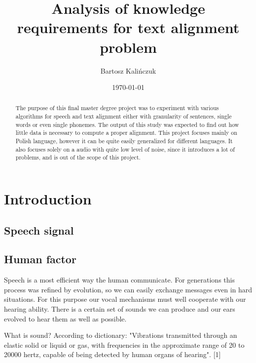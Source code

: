 \documentclass[12pt,a4paper,english]{article}
\begin{document}
\title{Analysis of knowledge requirements for text alignment problem}
\author{Bartosz Kalińczuk}
\date{\today}
\maketitle

\newpage
\begin{abstract}
The purpose of this final master degree project was to experiment with various algorithms for speech and text alignment either with granularity of sentences, single words or even single phonemes. The output of this study was expected to find out how little data is necessary to compute a proper alignment. This project focuses mainly on Polish language, however it can be quite easily generalized for different languages. It also focuses solely on a audio with quite low level of noise, since  it introduces a lot of problems, and is out of the scope of this project.
\end{abstract}


\newpage
\setcounter{tocdepth}{2}
\tableofcontents

\newpage
\section{Introduction}

\newpage
\begin{center}
    \section{Speech signal}
\end {center}
\subsection{Human factor}

Speech is a most efficient way the human communicate. For generations this process was refined by evolution, so we can easily exchange messages even in hard situations. For this purpose our vocal mechanisms must well cooperate with our hearing ability. There is a certain set of sounds we can produce and our ears evolved to hear them as well as possible.\newline 

What is sound? According to dictionary: "Vibrations transmitted through an elastic solid or liquid or gas, with frequencies in the approximate range of 20 to 20000 hertz, capable of being detected by human organs of hearing". [1]\newline
\end{document}
